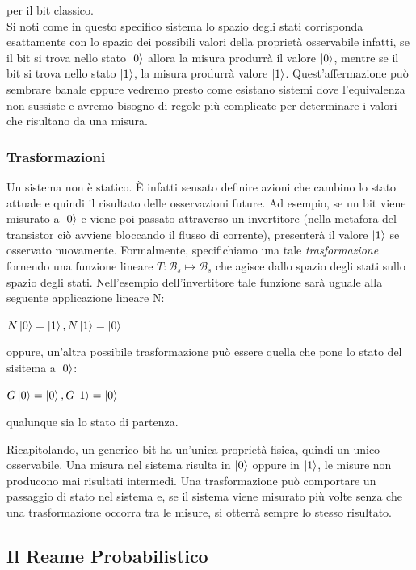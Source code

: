 \documentclass[12pt,a4paper,openright]{report}
\begin{document}
per il bit classico.\\
Si noti come in questo specifico sistema lo spazio degli stati corrisponda esattamente con lo spazio dei possibili valori della proprietà
osservabile infatti, se il bit si trova nello stato $\ket0$ allora la misura produrrà il valore $\ket0$, mentre se il bit si trova nello stato $\ket1$,
la misura produrrà valore $\ket1$. Quest'affermazione può sembrare banale eppure vedremo presto come esistano sistemi dove l'equivalenza 
non sussiste e avremo bisogno di regole più complicate per determinare i valori che risultano da una misura. 

\subsubsection{Trasformazioni}
Un sistema non è statico. È infatti sensato definire azioni che cambino lo stato attuale e quindi il risultato delle osservazioni future. Ad esempio,
se un bit viene misurato a $\ket0$ e viene poi passato attraverso un invertitore (nella metafora del transistor ciò avviene bloccando il flusso di corrente), presenterà il valore $\ket1$ se osservato nuovamente. 
Formalmente, specifichiamo una tale \emph{trasformazione} fornendo una funzione lineare $T:\mathcal{B}_s \mapsto \mathcal{B}_s$ che agisce dallo spazio degli stati sullo spazio degli stati. 
Nell'esempio dell'invertitore tale funzione sarà uguale alla seguente applicazione lineare N:
\begin{center}
    $ N\ket0 = \ket1, N\ket1 = \ket0 $
\end{center}
oppure, un'altra possibile trasformazione può essere quella che pone lo stato del sisitema a $\ket0$:
\begin{center}
    $G\ket0 = \ket0,  G\ket1 = \ket0$
\end{center}
qualunque sia lo stato di partenza.
\par
Ricapitolando, un generico bit ha un'unica proprietà fisica, quindi un unico osservabile. Una misura nel sistema risulta in $\ket0$ oppure in $\ket1$, le 
misure non producono mai risultati intermedi. Una trasformazione può comportare un passaggio di stato nel sistema e, se il sistema viene misurato più volte 
 senza che una trasformazione occorra tra le misure, si otterrà sempre lo stesso risultato.

\subsection{Il Reame Probabilistico}
\end{document}
